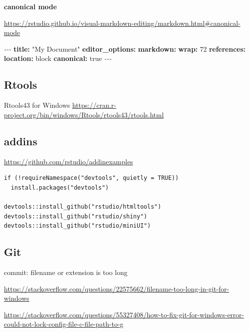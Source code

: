 \documentclass[
]{book}
\newenvironment{Shaded}{\begin{snugshade}}{\end{snugshade}}
\newcommand{\AttributeTok}[1]{\textcolor[rgb]{0.13,0.29,0.53}{#1}}
\newcommand{\CharTok}[1]{\textcolor[rgb]{0.31,0.60,0.02}{#1}}
\newcommand{\DecValTok}[1]{\textcolor[rgb]{0.00,0.00,0.81}{#1}}
\newcommand{\FunctionTok}[1]{\textcolor[rgb]{0.13,0.29,0.53}{\textbf{#1}}}
\newcommand{\KeywordTok}[1]{\textcolor[rgb]{0.13,0.29,0.53}{\textbf{#1}}}
\newcommand{\PreprocessorTok}[1]{\textcolor[rgb]{0.56,0.35,0.01}{\textit{#1}}}
\newcommand{\StringTok}[1]{\textcolor[rgb]{0.31,0.60,0.02}{#1}}
\theoremstyle{definition}
\theoremstyle{definition}
\theoremstyle{definition}
\theoremstyle{definition}
\theoremstyle{remark}
\begin{document}
\textbf{canonical mode}

\url{https://rstudio.github.io/visual-markdown-editing/markdown.html\#canonical-mode}

\begin{Shaded}
\begin{Highlighting}[]
\PreprocessorTok{{-}{-}{-}}
\FunctionTok{title}\KeywordTok{:}\AttributeTok{ }\StringTok{"My Document"}
\FunctionTok{editor\_options}\KeywordTok{:}
\AttributeTok{  }\FunctionTok{markdown}\KeywordTok{:}
\AttributeTok{    }\FunctionTok{wrap}\KeywordTok{:}\AttributeTok{ }\DecValTok{72}
\AttributeTok{    }\FunctionTok{references}\KeywordTok{:}\AttributeTok{ }
\AttributeTok{      }\FunctionTok{location}\KeywordTok{:}\AttributeTok{ block}
\AttributeTok{    }\FunctionTok{canonical}\KeywordTok{:}\AttributeTok{ }\CharTok{true}
\PreprocessorTok{{-}{-}{-}}
\end{Highlighting}
\end{Shaded}

\subsection{Rtools}\label{rtools}

Rtools43 for Windows
\url{https://cran.r-project.org/bin/windows/Rtools/rtools43/rtools.html}

\subsection{addins}\label{addins}

\url{https://github.com/rstudio/addinexamples}

\begin{verbatim}
if (!requireNamespace("devtools", quietly = TRUE))
  install.packages("devtools")
  
devtools::install_github("rstudio/htmltools")
devtools::install_github("rstudio/shiny")
devtools::install_github("rstudio/miniUI")
\end{verbatim}

\subsection{Git}\label{git}

commit: filename or extension is too long

\url{https://stackoverflow.com/questions/22575662/filename-too-long-in-git-for-windows}

\url{https://stackoverflow.com/questions/55327408/how-to-fix-git-for-windows-error-could-not-lock-config-file-c-file-path-to-g}
\end{document}
